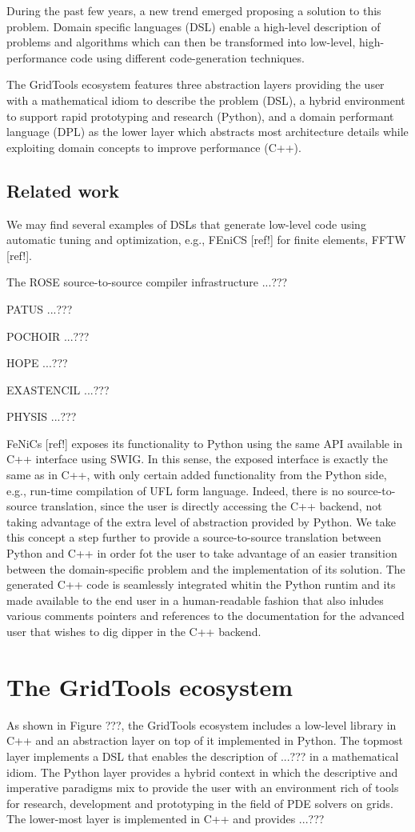 \documentclass[english]{article}
\begin{document}
During the past few years, a new trend emerged proposing a solution to this problem. Domain specific languages (DSL) enable a high-level description of problems and algorithms which can then be transformed into low-level, high-performance code using different code-generation techniques.

The GridTools ecosystem features three abstraction layers providing the user with a mathematical idiom to describe the problem (DSL), a hybrid environment to support rapid prototyping and research (Python), and a domain performant language (DPL) as the lower layer which abstracts most architecture details while exploiting domain concepts to improve performance (C++).

\subsection{Related work}
We may find several examples of DSLs that generate low-level code using automatic tuning and optimization, e.g., FEniCS [ref!] for finite elements, FFTW [ref!].

The ROSE source-to-source compiler infrastructure ...???

PATUS ...???

POCHOIR ...???

HOPE ...???

EXASTENCIL ...???

PHYSIS ...???

FeNiCs [ref!] exposes its functionality to Python using the same API available in C++ interface using SWIG.
In this sense, the exposed interface is exactly the same as in C++, with only certain added functionality from the Python side, e.g., run-time compilation of UFL form language.
Indeed, there is no source-to-source translation, since the user is directly accessing the C++ backend, not taking advantage of the extra level of abstraction provided by Python.
We take this concept a step further to provide a source-to-source translation between Python and C++ in order fot the user to take advantage of an easier transition between the domain-specific problem and the implementation of its solution.
The generated C++ code is seamlessly integrated whitin the Python runtim and its made available to the end user in a human-readable fashion that also inludes various comments pointers and references to the documentation for the advanced user that wishes to dig dipper in the C++ backend.


\section{The GridTools ecosystem}
As shown in Figure ???, the GridTools ecosystem includes a low-level library in C++ and an abstraction layer on top of it implemented in Python.
The topmost layer implements a DSL that enables the description of ...??? in a mathematical idiom.
The Python layer provides a hybrid context in which the descriptive and imperative paradigms mix to provide the user with an environment rich of tools for research, development and prototyping in the field of PDE solvers on grids.
The lower-most layer is implemented in C++ and provides ...???
\end{document}
